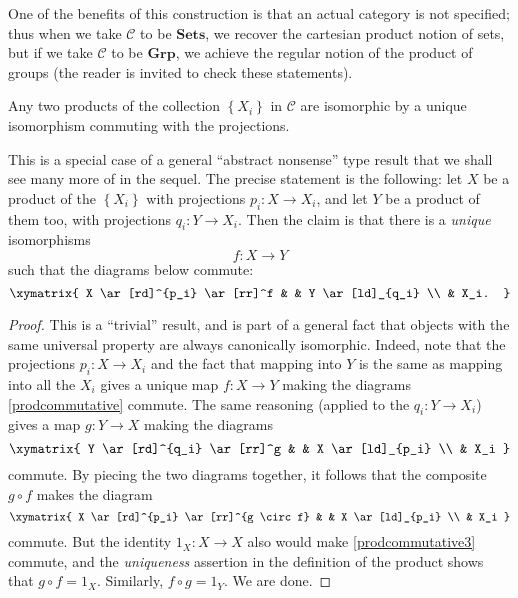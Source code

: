 \begin{example} One of the benefits of this construction is that an actual
category is not specified; thus when we take $\mathcal{C}$ to be
$\mathbf{Sets}$, we
recover the cartesian product notion of sets, but if we take $\mathcal{C}$ to
be $\mathbf{Grp}$, we achieve the regular notion of the product of groups (the reader is
invited to check these statements). \end{example}

\begin{proposition}
Any two products of the collection $\left\{X_i\right\}$ in $\mathcal{C}$ are
isomorphic by a unique isomorphism commuting with the projections.
\end{proposition} 
This is a special case of a general ``abstract nonsense'' type result that we
shall see many more of in the sequel.
The precise statement is the following: let $X$ be a product of the
$\left\{X_i\right\}$ with projections $p_i : X \to X_i$, and let $Y$ be a
product of them too, with projections $q_i: Y \to X_i$. 
Then the claim is that there is a \emph{unique} isomorphisms
\[ f: X \to Y  \]
such that the diagrams below commute:
\begin{equation} \label{prodcommutative} \xymatrix{
X \ar[rd]^{p_i}  \ar[rr]^f &  & Y \ar[ld]_{q_i} \\
& X_i. 
}\end{equation}
\begin{proof} 
This is a ``trivial'' result, and is part of a general fact that objects
with the same universal property are always canonically isomorphic. Indeed, note that the projections $p_i: X \to
X_i$ and the fact that mapping into $Y$ is the same as mapping into all the
$X_i$ gives a unique map $f: X \to Y$ making the diagrams
\eqref{prodcommutative} commute. The same reasoning (applied to the $q_i: Y \to
X_i$) gives a map $g:  Y \to X$ making the diagrams
\begin{equation} \label{prodcommutative2} \xymatrix{
Y \ar[rd]^{q_i}  \ar[rr]^g &  & X \ar[ld]_{p_i} \\
& X_i 
}\end{equation}
commute. By piecing the two diagrams together, it follows that the composite $g \circ f$ makes the diagram
\begin{equation} \label{prodcommutative3} \xymatrix{
X \ar[rd]^{p_i}  \ar[rr]^{g \circ f} &  & X \ar[ld]_{p_i} \\
& X_i 
}\end{equation}
commute. 
But the identity $1_X: X \to X$ also would make \eqref{prodcommutative3}
commute, and the \emph{uniqueness} assertion in the definition of the product
shows that $g \circ f = 1_X$. Similarly, $f \circ g = 1_Y$. We are done.
\end{proof} 
